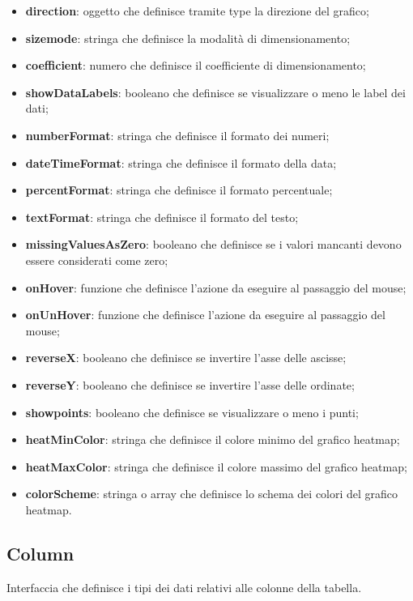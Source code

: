 \begin{itemize}
      \item \textbf{direction}: oggetto che definisce tramite type la direzione del grafico;
      \item \textbf{sizemode}: stringa che definisce la modalità di dimensionamento;
      \item \textbf{coefficient}: numero che definisce il coefficiente di dimensionamento;
      \item \textbf{showDataLabels}: booleano che definisce se visualizzare o meno le label dei dati;
      \item \textbf{numberFormat}: stringa che definisce il formato dei numeri;
      \item \textbf{dateTimeFormat}: stringa che definisce il formato della data;
      \item \textbf{percentFormat}: stringa che definisce il formato percentuale;
      \item \textbf{textFormat}: stringa che definisce il formato del testo;
      \item \textbf{missingValuesAsZero}: booleano che definisce se i valori mancanti devono essere considerati come zero;
      \item \textbf{onHover}: funzione che definisce l'azione da eseguire al passaggio del mouse;
      \item \textbf{onUnHover}: funzione che definisce l'azione da eseguire al passaggio del mouse;
      \item \textbf{reverseX}: booleano che definisce se invertire l'asse delle ascisse;
      \item \textbf{reverseY}: booleano che definisce se invertire l'asse delle ordinate;
      \item \textbf{showpoints}: booleano che definisce se visualizzare o meno i punti;
      \item \textbf{heatMinColor}: stringa che definisce il colore minimo del grafico heatmap;
      \item \textbf{heatMaxColor}: stringa che definisce il colore massimo del grafico heatmap;
      \item \textbf{colorScheme}: stringa o array che definisce lo schema dei colori del grafico heatmap.
\end{itemize}

\subsection{Column}
Interfaccia che definisce i tipi dei dati relativi alle colonne della tabella.

